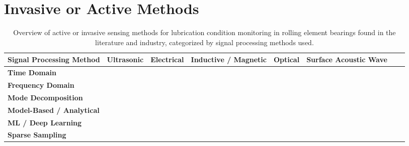 
\section{Invasive or Active Methods}
\begin{table}[!h]
\scriptsize
\centering
\renewcommand{\arraystretch}{1.3}
\setlength{\tabcolsep}{4pt}

\begin{tabularx}{\linewidth}{| 
>{\raggedright\arraybackslash} p{2cm} | X | X | X | X | X | X | X}

\hline
\textbf{Signal Processing Method} &
\textbf{Ultrasonic} &
\textbf{Electrical} &
\textbf{Inductive / Magnetic} &
\textbf{Optical} &
\textbf{Surface Acoustic Wave}
\\

\hline

\textbf{Time Domain}
& \cite{shang_comprehensive_2024} \cite{sun_online_2021} \cite{lineham_ultrasonic_2008}
& \cite{sun_online_2021}
& \cite{sun_online_2021}
& \cite{sun_online_2021}
& \cite{kestel_condition_2025} \cite{chmelar_experimental_2020} \cite{lindner_a23_2011}
\\
\hline

\textbf{Frequency Domain}
&
& \cite{sun_online_2021}
& 
&
&
\\

\hline

\textbf{Mode Decomposition}
&
&
& \cite{yu_novel_2021}
&
&

\\

\hline

\textbf{Model-Based / Analytical}
& \cite{shang_comprehensive_2024} \cite{drinkwater_ultrasonic_2009} \cite{wang_accuracy-improved_2024} \cite{chen_evaluation_2023} \cite{zhu_lubricating_2017} \cite{sun_online_2021} \cite{dou_review_2022} \cite{zhang_ultrasonic_2015}
& \cite{cen_ehl_2021} \cite{becker-dombrowsky_electrical_2024} \cite{cen_film_2019} \cite{cojocaru_grease_2025} \cite{zhang_grease_2021} \cite{maruyama_lubrication_2023} \cite{maruyama_lubrication_2019} \cite{dai_situ_2024} \cite{zhu_lubricating_2017} \cite{schneider_method_2022} \cite{sun_online_2021} \cite{jablonka_quantitative_2018}
& \cite{zhu_lubricating_2017}
& \cite{cen_film_2019} \cite{zhu_lubricating_2017} \cite{liu_oil_2022} \cite{sun_online_2021} \cite{jablonka_quantitative_2018}
& \cite{chmelar_experimental_2020} \cite{lindner_a23_2011}
\\

\hline

\textbf{ML / Deep Learning}
& 
& 
& 
& \cite{wang_online_2022}
&
\\

\hline

\textbf{Sparse Sampling}
& \cite{chen_sub-nyquist_2025}
&
&
&
&
\\
\hline


\hline

\end{tabularx}
\caption{Overview of active or invasive sensing methods for lubrication condition monitoring in rolling element bearings found in the literature and industry, categorized by signal processing methods used.}
\label{tab:invasive_methods}
\end{table}